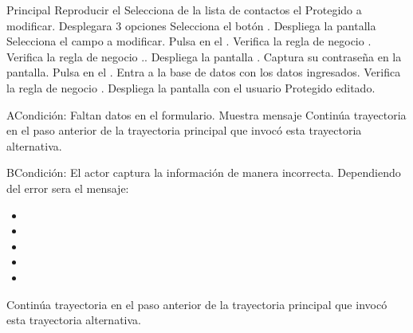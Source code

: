 	\begin{UCtrayectoria}{Principal}
		\UCpaso Reproducir el 
		\UCpaso[\UCactor] Selecciona de la lista de contactos el Protegido a modificar.
		\UCpaso[\UCsist] Desplegara 3 opciones   
		\UCpaso[\UCactor] Selecciona el botón .		
		\UCpaso[\UCactor] Despliega la pantalla 
		\UCpaso[\UCactor] Selecciona el campo a modificar.
		\UCpaso[\UCactor] Pulsa en el  .
		\UCpaso[\UCsist] Verifica la regla de negocio . 
		\UCpaso[\UCsist] Verifica la regla de negocio .. 
		\UCpaso[\UCsist] Despliega la pantalla .
		\UCpaso[\UCactor] Captura su contraseña en la pantalla.
		\UCpaso[\UCactor] Pulsa en el  .
		\UCpaso[\UCsist] Entra a la base de datos con los datos ingresados.  
		\UCpaso[\UCsist] Verifica la regla de negocio . 
		\UCpaso[\UCsist] Despliega la pantalla  con el usuario Protegido editado.
	\end{UCtrayectoria}
	\begin{UCtrayectoriaA}{A}{Condición: Faltan datos en el formulario.}
		\UCpaso[\UCsist] Muestra mensaje 
		\UCpaso[\UCsist] Continúa trayectoria en el paso anterior de la trayectoria  principal que invocó esta trayectoria alternativa. 
	\end{UCtrayectoriaA}
	\begin{UCtrayectoriaA}{B}{Condición: El actor captura la información de manera incorrecta.}
		\UCpaso[\UCsist] Dependiendo del error sera el mensaje:
			\begin{itemize}
			\item {}
			\item {}
			\item {}
			\item {}
			\item {}
			\end{itemize}
		\UCpaso[\UCsist] Continúa trayectoria en el paso anterior de la trayectoria principal que invocó esta trayectoria alternativa. 
	\end{UCtrayectoriaA}
